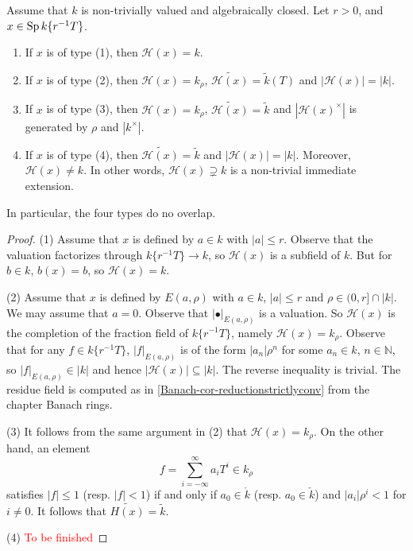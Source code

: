 \begin{proposition}\label{prop-Berkovdiskprop}
    Assume that $k$ is non-trivially valued and algebraically closed.
    Let $r>0$, and $x\in \operatorname{Sp} k\{r^{-1}T\}$.
    \begin{enumerate}
        \item If $x$ is of type (1), then $\mathscr{H}(x)=k$.
        \item If $x$ is of type (2), then $\mathscr{H}(x)=k_{\rho}$, $\widetilde{\mathscr{H}(x)}=\tilde{k}(T)$ and $|\mathscr{H}(x)|=|k|$.
        \item If $x$ is of type (3), then $\mathscr{H}(x)=k_{\rho}$, $\widetilde{\mathscr{H}(x)}=\tilde{k}$ and $|\mathscr{H}(x)^{\times}|$ is generated by $\rho$ and $|k^{\times}|$.
        \item If $x$ is of type (4), then $\widetilde{\mathscr{H}(x)}=\tilde{k}$ and $|\mathscr{H}(x)|=|k|$. Moreover, $\mathscr{H}(x)\neq k$.
        In other words, $\mathscr{H}(x)\supsetneq k$ is a non-trivial immediate extension.
    \end{enumerate}
    In particular, the four types do no overlap.
\end{proposition}
\begin{proof}
    (1) Assume that $x$ is defined by $a\in k$ with $|a|\leq r$. Observe that the valuation factorizes through $k\{r^{-1}T\}\rightarrow k$, so $\mathscr{H}(x)$ is a subfield of $k$. But for $b\in k$, $b(x)=b$, so $\mathscr{H}(x)=k$.

    (2) Assume that $x$ is defined by $E(a,\rho)$ with $a\in k$, $|a|\leq r$ and $\rho\in (0,r]\cap |k|$. We may assume that $a=0$. Observe that $|\bullet|_{E(a,\rho)}$ is a valuation. So $\mathscr{H}(x)$ is the completion of the fraction field of $k\{r^{-1}T\}$, namely $\mathscr{H}(x)=k_{\rho}$. 
    Observe that for any $f\in k\{r^{-1}T\}$, $|f|_{E(a,\rho)}$ is of the form $|a_n|\rho^n$ for some $a_n\in k$, $n\in \mathbb{N}$, so $|f|_{E(a,\rho)}\in |k|$ and hence $|\mathscr{H}(x)|\subseteq|k|$. The reverse inequality is trivial. The residue field is computed as in \cref{Banach-cor-reductionstrictlyconv} from the chapter Banach rings.

    (3) It follows from the same argument in (2) that $\mathscr{H}(x)=k_{\rho}$. On the other hand, an element 
    \[
        f=\sum_{i=-\infty}^{\infty}a_iT^i\in k_{\rho}  
    \]
    satisfies $|f|\leq 1$ (resp. $|f|<1$) if and only if $a_0\in \mathring{k}$ (resp. $a_0\in \check{k}$) and $|a_i|\rho^i<1$ for $i\neq 0$. It follows that $\widetilde{H(x)}=\tilde{k}$.

    (4) \textcolor{red}{To be finished}
\end{proof}


